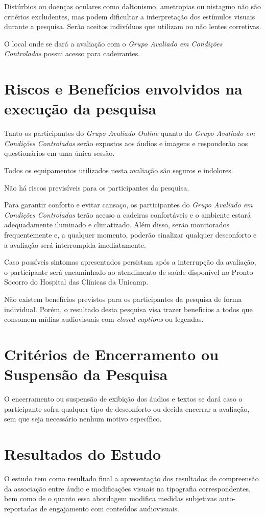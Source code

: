 \documentclass[a4paper,11pt,titlepage,singlespacing]{article}
\begin{document}
\noindent Distúrbios ou doenças oculares como daltonismo, ametropias ou nistagmo não são critérios excludentes, mas podem dificultar a interpretação dos estímulos visuais durante a pesquisa. Serão aceitos indivíduos que utilizam ou não lentes corretivas. 

O local onde se dará a avaliação com o \textit{Grupo Avaliado em Condições Controladas} possui acesso para cadeirantes.

\section{Riscos e Benefícios envolvidos na execução da pesquisa}
\noindent Tanto os participantes do \textit{Grupo Avaliado Online} quanto do \textit{Grupo Avaliado em Condições Controladas} serão expostos aos áudios e imagens e responderão aos questionários em uma única sessão.

Todos os equipamentos utilizados nesta avaliação são seguros e indolores. 

Não há riscos previsíveis para os participantes da pesquisa.

Para garantir conforto e evitar cansaço, os participantes do \textit{Grupo Avaliado em Condições Controladas} terão acesso a cadeiras confortáveis e o ambiente estará adequadamente iluminado e climatizado. Além disso, serão monitorados frequentemente e, a qualquer momento, poderão sinalizar qualquer desconforto e a avaliação será interrompida imediatamente. 

Caso possíveis sintomas apresentados persistam após a interrupção da avaliação, o participante será encaminhado ao atendimento de saúde disponível no Pronto Socorro do Hospital das Clínicas da Unicamp.

Não existem benefícios previstos para os participantes da pesquisa de forma individual. Porém, o resultado desta pesquisa visa trazer benefícios a todos que consomem mídias audiovisuais com \textit{closed captions} ou legendas.

\section{Critérios de Encerramento ou Suspensão da Pesquisa}
\noindent O encerramento ou suspensão de exibição dos áudios e textos se dará caso o participante sofra qualquer tipo de desconforto ou decida encerrar a avaliação, sem que seja necessário nenhum motivo específico. 

\section{Resultados do Estudo}
\noindent O estudo tem como resultado final a apresentação dos resultados de compreensão da associação entre áudio e modificações visuais na tipografia correspondentes, bem como de o quanto essa abordagem modifica medidas subjetivas auto-reportadas de engajamento com conteúdos audiovisuais.
\end{document}

